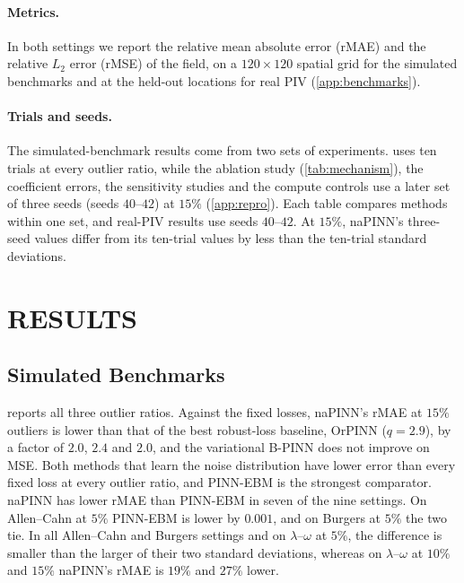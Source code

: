 \documentclass[twoside]{article}
\begin{document}
\paragraph{Metrics.}
In both settings we report the relative mean absolute error (rMAE) and the
relative $L_2$ error (rMSE) of the field, on a $120 \times 120$ spatial grid for
the simulated benchmarks and at the held-out locations for real PIV
(\cref{app:benchmarks}).

\paragraph{Trials and seeds.}
The simulated-benchmark results come from two sets of experiments.
 uses ten trials at every outlier ratio, while the ablation
study (\cref{tab:mechanism}), the coefficient errors, the sensitivity studies
and the compute controls use a later set of three seeds
(seeds $40$--$42$) at $15\%$
(\cref{app:repro}). Each table compares methods within one set, and real-PIV
results use seeds $40$--$42$. At $15\%$, naPINN's three-seed values differ from
its ten-trial values by less than the ten-trial standard deviations.

\section{RESULTS}
\label{sec:results}





\subsection{Simulated Benchmarks}
\label{sec:exact}

 reports all three outlier ratios. Against the fixed losses,
naPINN's rMAE at $15\%$ outliers is lower than that of the best robust-loss
baseline, OrPINN ($q = 2.9$), by a factor of $2.0$, $2.4$ and $2.0$, and the
variational B-PINN does not improve on MSE. Both methods that learn the noise
distribution have lower error than every fixed loss at every outlier ratio, and
PINN-EBM is the strongest comparator. naPINN has lower rMAE than PINN-EBM in
seven of the nine settings. On Allen--Cahn at $5\%$ PINN-EBM is lower by
$0.001$, and on Burgers at $5\%$ the two tie. In all Allen--Cahn and Burgers
settings and on $\lambda$--$\omega$ at $5\%$, the difference is smaller than the
larger of their two standard deviations, whereas on $\lambda$--$\omega$ at
$10\%$ and $15\%$ naPINN's rMAE is $19\%$ and $27\%$ lower.
\end{document}
